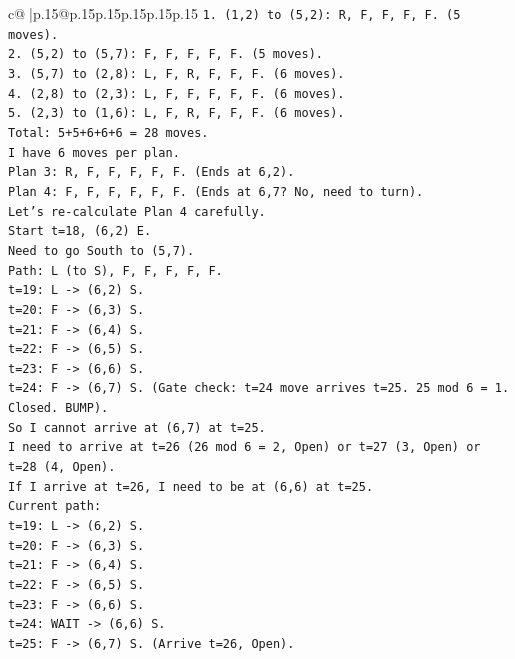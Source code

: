 \documentclass{article}
\begin{document}
{\begin{supertabular}{c@{$\;$}|p{.15\linewidth}@{}p{.15\linewidth}p{.15\linewidth}p{.15\linewidth}p{.15\linewidth}p{.15\linewidth}}
{{{\texttt{1. (1,2) to (5,2): R, F, F, F, F. (5 moves).} \\
\texttt{2. (5,2) to (5,7): F, F, F, F, F. (5 moves).} \\
\texttt{3. (5,7) to (2,8): L, F, R, F, F, F. (6 moves).} \\
\texttt{4. (2,8) to (2,3): L, F, F, F, F, F. (6 moves).} \\
\texttt{5. (2,3) to (1,6): L, F, R, F, F, F. (6 moves).} \\
\texttt{Total: 5+5+6+6+6 = 28 moves.} \\
\texttt{I have 6 moves per plan.} \\
\texttt{Plan 3: R, F, F, F, F, F. (Ends at 6,2).} \\
\texttt{Plan 4: F, F, F, F, F, F. (Ends at 6,7? No, need to turn).} \\
\texttt{Let's re{-}calculate Plan 4 carefully.} \\
\texttt{Start t=18, (6,2) E.} \\
\texttt{Need to go South to (5,7).} \\
\texttt{Path: L (to S), F, F, F, F, F.} \\
\texttt{t=19: L {-}> (6,2) S.} \\
\texttt{t=20: F {-}> (6,3) S.} \\
\texttt{t=21: F {-}> (6,4) S.} \\
\texttt{t=22: F {-}> (6,5) S.} \\
\texttt{t=23: F {-}> (6,6) S.} \\
\texttt{t=24: F {-}> (6,7) S. (Gate check: t=24 move arrives t=25. 25 mod 6 = 1. Closed. BUMP).} \\
\texttt{So I cannot arrive at (6,7) at t=25.} \\
\texttt{I need to arrive at t=26 (26 mod 6 = 2, Open) or t=27 (3, Open) or t=28 (4, Open).} \\
\texttt{If I arrive at t=26, I need to be at (6,6) at t=25.} \\
\texttt{Current path:} \\
\texttt{t=19: L {-}> (6,2) S.} \\
\texttt{t=20: F {-}> (6,3) S.} \\
\texttt{t=21: F {-}> (6,4) S.} \\
\texttt{t=22: F {-}> (6,5) S.} \\
\texttt{t=23: F {-}> (6,6) S.} \\
\texttt{t=24: WAIT {-}> (6,6) S.} \\
\texttt{t=25: F {-}> (6,7) S. (Arrive t=26, Open).} \\
}}}
\end{supertabular}}
\end{document}
